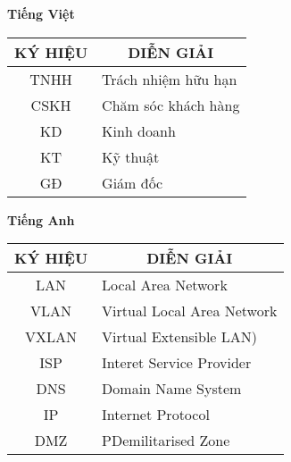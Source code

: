 \vspace{2em}

\textbf{Tiếng Việt}
\begin{table}[ht!]
\centering
\begin{tabular}{|c|l|}
\hline
\textbf{KÝ HIỆU} & \multicolumn{1}{c|}{\textbf{DIỄN GIẢI}}                     \\ \hline
TNHH              & Trách nhiệm hữu hạn                    \\ \hline
CSKH            &    Chăm sóc khách hàng                            \\ \hline
KD              &Kinh doanh\\ \hline
KT&Kỹ thuật\\ \hline

GĐ       &     Giám đốc                      \\ \hline
\end{tabular}
\end{table}


\textbf{Tiếng Anh}
\begin{table}[ht!]
\centering
\begin{tabular}{|c|l|}
\hline
\textbf{KÝ HIỆU} & \multicolumn{1}{c|}{\textbf{DIỄN GIẢI}}                     \\ \hline
LAN              &     Local Area Network                                  \\ \hline
VLAN              &     Virtual Local Area Network                                  \\ \hline
VXLAN              &     Virtual Extensible LAN)                                            \\ \hline
ISP              & Interet Service Provider                     \\ \hline
DNS       &     Domain Name System                      \\ \hline
IP              &   Internet Protocol                    \\ \hline
DMZ            & PDemilitarised Zone                                       \\ \hline

\end{tabular}
\end{table}


\newpage
